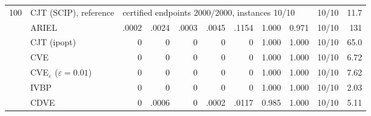 \begin{table}[htbp]
\begin{tabular}{rlrrrrrrrlr}
\midrule
100 & CJT (SCIP), reference & \multicolumn{7}{l}{certified endpoints 2000/2000, instances 10/10} & 10/10 & 11.7 \\
 & ARIEL & .0002 & .0024 & .0003 & .0045 & .1154 & 1.000 & 0.971 & 10/10 & 131 \\
 & CJT (ipopt) & 0 & 0 & 0 & 0 & 0 & 1.000 & 1.000 & 10/10 & 65.0 \\
 & CVE & 0 & 0 & 0 & 0 & 0 & 1.000 & 1.000 & 10/10 & 6.72 \\
 & CVE$_\varepsilon$ ($\varepsilon{=}0.01$) & 0 & 0 & 0 & 0 & 0 & 1.000 & 1.000 & 10/10 & 7.62 \\
 & IVBP & 0 & 0 & 0 & 0 & 0 & 1.000 & 1.000 & 10/10 & 2.03 \\
 & CDVE & 0 & .0006 & 0 & .0002 & .0117 & 0.985 & 1.000 & 10/10 & 5.11 \\
\bottomrule
\end{tabular}
\end{table}
